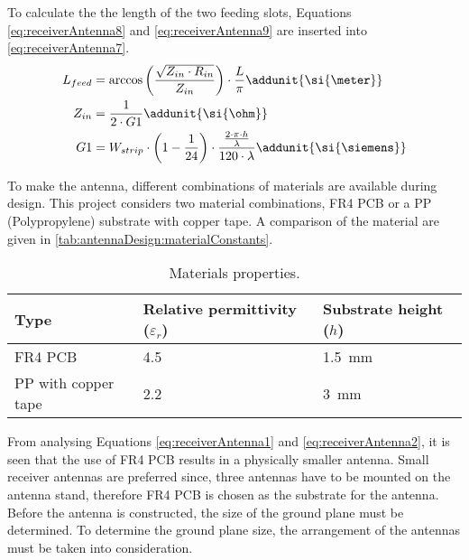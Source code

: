 To calculate the the length of the two feeding slots, Equations \ref{eq:receiverAntenna8} and \ref{eq:receiverAntenna9} are inserted into \autoref{eq:receiverAntenna7}.
\begin{subequations}
\begin{align} 
L_{feed} &= \arccos\left(\frac{\sqrt{Z_{in}\cdot R_{in}}}{Z_{in}}\right)\cdot \frac{L}{\pi} \addunit{\si{\meter}} \label{eq:receiverAntenna7} \\
Z_{in} &= \frac{1}{2\cdot G1} \addunit{\si{\ohm}} \label{eq:receiverAntenna8} \\  
G1 &= W_{strip} \cdot \left(1-\frac{1}{24}\right) \cdot \frac{\frac{2 \cdot \pi \cdot h}{\lambda}}{120\cdot \lambda} \addunit{\si{\siemens}} \label{eq:receiverAntenna9} 
\end{align}
\end{subequations} 
\startexplain
{}
\stopexplain

To make the antenna, different combinations of materials are available during design. This project considers two material combinations, FR4 PCB or a PP (Polypropylene) substrate with copper tape. A comparison of the material are given in \autoref{tab:antennaDesign:materialConstants}. 
\begin{table}[h]
\centering
\caption{Materials properties.}\label{tab:antennaDesign:materialConstants}
\begin{tabular}{l l l}
\textbf{Type}	& \textbf{Relative permittivity ($ \varepsilon_r$)} & \textbf{Substrate height ($h$)} 	\\ \toprule \rowcolor{lightGrey}
FR4 PCB& \SI{4.5}{} & \SI{1.5}{\milli\meter} 	\\
PP with copper tape & \SI{2.2}{} & \SI{3}{\milli\meter}  
\end{tabular}
\end{table}

From analysing Equations \ref{eq:receiverAntenna1} and \ref{eq:receiverAntenna2}, it is seen that the use of FR4 PCB results in a physically smaller antenna. Small receiver antennas are preferred since, three antennas have to be mounted on the antenna stand, therefore FR4 PCB is chosen as the substrate for the antenna. Before the antenna is constructed, the size of the ground plane must be determined. To determine the ground plane size, the arrangement of the antennas must be taken into consideration.

